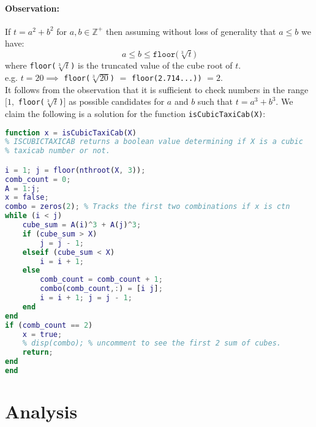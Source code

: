 \documentclass[12pt]{report}
\begin{document}
\paragraph{Observation:}
If $t=a^2 +b^2$ for $a, b \in \mathbb{Z^+}$ then assuming without loss of generality that $a \leqslant b$ we have:
\begin{equation*}
	a \leqslant b \leqslant \texttt{floor(}\sqrt[3]{t}\texttt{)} 
\end{equation*} where \texttt{floor($\sqrt[3]{t}$)} is the truncated value of the cube root of $t$. \\ 
e.g. $t=20 \implies$ \texttt{floor($\sqrt[3]{20}$)} $=$ \texttt{floor(2.714...))} $=2$. \\

It follows from the observation that it is sufficient to check numbers in the range $[1,$ \texttt{floor($\sqrt[3]{t}$)}$]$ as possible candidates for $a$ and $b$ such that $t=a^3+b^3$. We claim the following is a solution for the function \texttt{isCubicTaxiCab(X)}: \\

\begin{lstlisting}[language=Matlab]
function x = isCubicTaxiCab(X)
% ISCUBICTAXICAB returns a boolean value determining if X is a cubic
% taxicab number or not.

i = 1; j = floor(nthroot(X, 3));
comb_count = 0;
A = 1:j;
x = false;
combo = zeros(2); % Tracks the first two combinations if x is ctn
while (i < j)
    cube_sum = A(i)^3 + A(j)^3;
    if (cube_sum > X)
        j = j - 1;
    elseif (cube_sum < X)
        i = i + 1;
    else
        comb_count = comb_count + 1;
        combo(comb_count,:) = [i j];
        i = i + 1; j = j - 1;
    end
end
if (comb_count == 2)
    x = true;
    % disp(combo); % uncomment to see the first 2 sum of cubes.
    return;
end
end
\end{lstlisting}

\section{Analysis}
\end{document}
